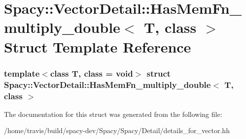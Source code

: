 \hypertarget{structSpacy_1_1VectorDetail_1_1HasMemFn__multiply__double}{\section{\-Spacy\-:\-:\-Vector\-Detail\-:\-:\-Has\-Mem\-Fn\-\_\-multiply\-\_\-double$<$ \-T, class $>$ \-Struct \-Template \-Reference}
\label{structSpacy_1_1VectorDetail_1_1HasMemFn__multiply__double}
}
\subsubsection*{template$<$class T, class = void$>$ struct Spacy\-::\-Vector\-Detail\-::\-Has\-Mem\-Fn\-\_\-multiply\-\_\-double$<$ T, class $>$}



\-The documentation for this struct was generated from the following file\-:\begin{DoxyCompactItemize}
\item 
/home/travis/build/spacy-\/dev/\-Spacy/\-Spacy/\-Detail/details\-\_\-for\-\_\-vector.\-hh\end{DoxyCompactItemize}
